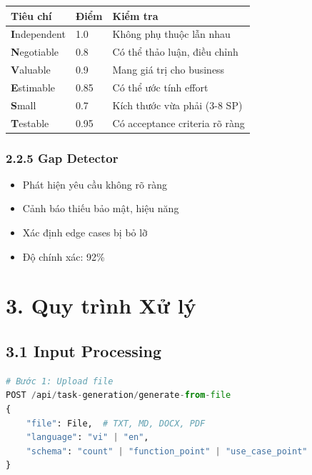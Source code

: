 \documentclass[12pt,a4paper]{article}
\begin{document}
\begin{table}[h]
\centering
\begin{tabular}{|l|l|l|}
\hline
\textbf{Tiêu chí} & \textbf{Điểm} & \textbf{Kiểm tra} \\
\hline
\textbf{I}ndependent & 1.0 & Không phụ thuộc lẫn nhau \\
\hline
\textbf{N}egotiable & 0.8 & Có thể thảo luận, điều chỉnh \\
\hline
\textbf{V}aluable & 0.9 & Mang giá trị cho business \\
\hline
\textbf{E}stimable & 0.85 & Có thể ước tính effort \\
\hline
\textbf{S}mall & 0.7 & Kích thước vừa phải (3-8 SP) \\
\hline
\textbf{T}estable & 0.95 & Có acceptance criteria rõ ràng \\
\hline
\end{tabular}
\end{table}

\subsubsection{2.2.5 Gap Detector}
\begin{itemize}
    \item Phát hiện yêu cầu không rõ ràng
    \item Cảnh báo thiếu bảo mật, hiệu năng
    \item Xác định edge cases bị bỏ lỡ
    \item Độ chính xác: 92\%
\end{itemize}

\section{3. Quy trình Xử lý}

\subsection{3.1 Input Processing}
\begin{lstlisting}[language=Python]
# Bước 1: Upload file
POST /api/task-generation/generate-from-file
{
    "file": File,  # TXT, MD, DOCX, PDF
    "language": "vi" | "en",
    "schema": "count" | "function_point" | "use_case_point"
}
\end{lstlisting}
\end{document}
